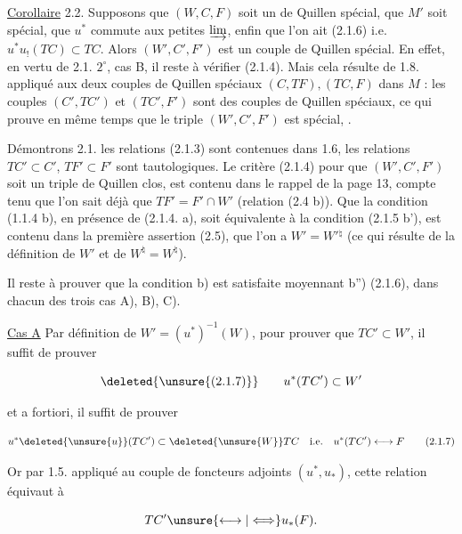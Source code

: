 \uline{Corollaire} 2.2. Supposons que $(W,C,F)$ soit un
 de Quillen spécial, que $M'$ soit spécial,
 que $u^*$ commute aux petites $\varinjlim$,
enfin que l'on ait (2.1.6) i.e. $u^*u_!(TC)\subset TC$.
Alors $(W',C',F')$ est un couple de Quillen
spécial.
En effet, en vertu de 2.1. $2^\circ$, cas B,  il reste
à vérifier  (2.1.4). Mais cela résulte
de 1.8. appliqué aux deux couples de Quillen
spéciaux $(C,TF),(TC,F)$ dans $M$ : les couples
$(C',TC')$ et $(TC',F')$ sont des couples de Quillen
spéciaux, ce qui prouve en même temps
que le triple $(W',C',F')$ est spécial, .

Démontrons 2.1.  les  relations (2.1.3) sont
contenues dans 1.6, les relations $TC'\subset C'$, $TF'\subset F'$
sont tautologiques. Le critère (2.1.4) pour
que $(W',C',F')$ soit un triple de Quillen clos,
est contenu dans le rappel de la page 13, compte
tenu que l'on sait déjà que $TF'=F'\cap W'$
(relation (2.4 b)). Que la condition (1.1.4 b),
en présence de (2.1.4. a), soit équivalente
à la condition (2.1.5 b'), est contenu dans
la première assertion (2.5),  que
l'on a $W'=W'{}^{\natural}$ (ce qui résulte de la définition
de $W'$ et de $W^{\natural}=W^{\natural}$).

Il reste à prouver  que la condition b) est
 satisfaite  moyennant  b'') (2.1.6),
dans chacun des trois cas A), B), C).

\uline{Cas A} Par définition de $W'=(u^*)^{-1}(W)$, pour
prouver que  $TC'\subset W'$, il suffit de prouver

\[
\deleted{\unsure{(2.1.7)}}\qquad u^*(TC')\subset W'
\]

et a fortiori, il suffit de prouver

\[
u^*\deleted{\unsure{u}}(TC')\subset\deleted{\unsure{W}}TC\quad\text{i.e.}\quad u^*(TC')\longleftrightarrow F\tag*{(2.1.7)}
\]

Or par 1.5. appliqué au couple de foncteurs
adjoints $(u^*,u_*)$, cette relation équivaut à

\[
TC'\unsure{\longleftrightarrow|\Longleftrightarrow}u_*(F).
\]

